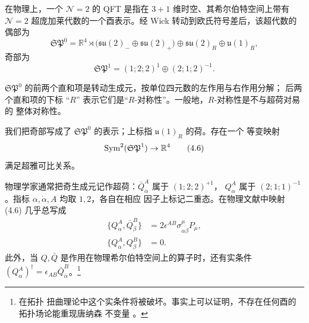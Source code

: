 在物理上，一个 $\mathcal{N}=2$ 的 QFT 是指在 $3+1$ 维时空、其希尔伯特空间上带有
$\mathcal{N}=2$ 超庞加莱代数的一个酉表示。经 Wick 转动到欧氏符号差后，该超代数的偶部为
\begin{equation}
  \mathfrak{SP}^{0}=\mathbb{R}^{4}\rtimes
  \bigl(\mathfrak{su}(2)_{-}\oplus\mathfrak{su}(2)_{+}\bigr)
  \oplus\mathfrak{su}(2)_{R}\oplus\mathfrak{u}(1)_{R},
  \tag{4.4}
\end{equation}
奇部为
\begin{equation}
  \mathfrak{SP}^{1}=(1;2;2)^{1}\oplus(2;1;2)^{-1}.
  \tag{4.5}
\end{equation}


$\mathfrak{SP}^{0}$ 的前两个直和项是转动生成元，按单位四元数的左作用与右作用分解；
后两个直和项的下标 “$R$” 表示它们是“$R$-对称性”。一般地，$R$-对称性是不与超荷对易的
整体对称性。

我们把奇部写成了 $\mathfrak{SP}^{0}$ 的表示；上标指 $\mathfrak{u}(1)_R$ 的荷。存在一个
等变映射
\begin{equation}
  \operatorname{Sym}^{2}(\mathfrak{SP}^{1})\to\mathbb{R}^{4}
  \tag{4.6}
\end{equation}
满足超雅可比关系。

物理学家通常把奇生成元记作超荷：$\bar{Q}^{A}_{\dot\alpha}$ 属于 $(1;2;2)^{+1}$，
$Q^{A}_{\alpha}$ 属于 $(2;1;1)^{-1}$。指标 $\alpha,\dot\alpha,A$ 均取 $1,2$，各自在相应
因子上标记二重态。在物理文献中映射 (4.6) 几乎总写成
\begin{equation}
  \begin{aligned}
    \{Q^{A}_{\alpha},\bar{Q}^{B}_{\dot\beta}\}
      &=2\epsilon^{AB}\sigma^{\mu}_{\alpha\dot\beta}P_{\mu},\\
    \{Q^{A}_{\alpha},Q^{B}_{\beta}\}
      &=0 .
  \end{aligned}
  \tag{4.7}
\end{equation}
此外，当 $Q,\bar{Q}$ 是作用在物理希尔伯特空间上的算子时，还有实条件
$(Q^{A}_{\alpha})^{\dagger}=\epsilon_{AB}\bar{Q}^{B}_{\dot\alpha}$。\footnote{在拓扑
扭曲理论中这个实条件将被破坏。事实上可以证明，不存在任何酉的拓扑场论能重现唐纳森
不变量 \cite{ref13}。}

